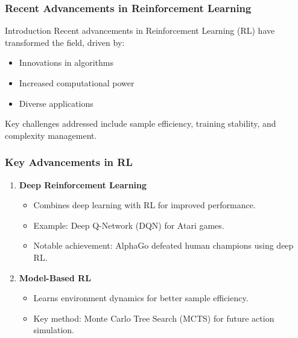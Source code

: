 \documentclass{beamer}
\begin{document}
\begin{frame}[fragile]
    \frametitle{Recent Advancements in Reinforcement Learning}
    \begin{block}{Introduction}
        Recent advancements in Reinforcement Learning (RL) have transformed the field, driven by:
        \begin{itemize}
            \item Innovations in algorithms
            \item Increased computational power
            \item Diverse applications
        \end{itemize}
        Key challenges addressed include sample efficiency, training stability, and complexity management.
    \end{block}
\end{frame}

\begin{frame}[fragile]
    \frametitle{Key Advancements in RL}
    \begin{enumerate}
        \item \textbf{Deep Reinforcement Learning}
            \begin{itemize}
                \item Combines deep learning with RL for improved performance.
                \item Example: Deep Q-Network (DQN) for Atari games.
                \item Notable achievement: AlphaGo defeated human champions using deep RL.
            \end{itemize}
        
        \item \textbf{Model-Based RL}
            \begin{itemize}
                \item Learns environment dynamics for better sample efficiency.
                \item Key method: Monte Carlo Tree Search (MCTS) for future action simulation.
            \end{itemize}
    \end{enumerate}
\end{frame}
\end{document}
